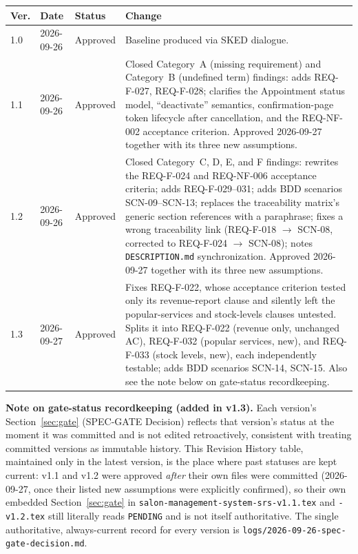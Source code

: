 \documentclass[11pt,a4paper]{article}
\begin{document}
\begin{tabularx}{\textwidth}{@{}lllX@{}}
\toprule
Ver. & Date & Status & Change \\
\midrule

1.0 & 2026-09-26 & Approved &
Baseline produced via SKED dialogue. \\

1.1 & 2026-09-26 & Approved &
Closed Category~A (missing requirement) and Category~B (undefined term)
findings: adds REQ-F-027, REQ-F-028; clarifies the Appointment status model,
``deactivate'' semantics, confirmation-page token lifecycle after
cancellation, and the REQ-NF-002 acceptance criterion. Approved 2026-09-27
together with its three new assumptions. \\

1.2 & 2026-09-26 & Approved &
Closed Category~C, D, E, and F findings: rewrites the REQ-F-024 and
REQ-NF-006 acceptance criteria; adds REQ-F-029--031; adds BDD scenarios
SCN-09--SCN-13; replaces the traceability matrix's generic section
references with a paraphrase; fixes a wrong traceability link
(REQ-F-018 $\to$ SCN-08, corrected to REQ-F-024 $\to$ SCN-08); notes
\texttt{DESCRIPTION.md} synchronization. Approved 2026-09-27 together
with its three new assumptions. \\

1.3 & 2026-09-27 & Approved &
Fixes REQ-F-022, whose acceptance criterion tested only its revenue-report
clause and silently left the popular-services and stock-levels clauses
untested. Splits it into REQ-F-022 (revenue only, unchanged AC),
REQ-F-032 (popular services, new), and REQ-F-033 (stock levels, new), each
independently testable; adds BDD scenarios SCN-14, SCN-15. Also see the
note below on gate-status recordkeeping. \\

\bottomrule
\end{tabularx}

\medskip

\noindent
\textbf{Note on gate-status recordkeeping (added in v1.3).}
Each version's Section~\ref{sec:gate} (SPEC-GATE Decision) reflects that
version's status at the moment it was committed and is not edited
retroactively, consistent with treating committed versions as immutable
history. This Revision History table, maintained only in the latest
version, is the place where past statuses are kept current: v1.1 and v1.2
were approved \emph{after} their own files were committed (2026-09-27,
once their listed new assumptions were explicitly confirmed), so their
own embedded Section~\ref{sec:gate} in
\texttt{salon-management-system-srs-v1.1.tex} and
\texttt{-v1.2.tex} still literally reads \texttt{PENDING} and is not
itself authoritative. The single authoritative, always-current record for
every version is \texttt{logs/2026-09-26-spec-gate-decision.md}.
\end{document}
